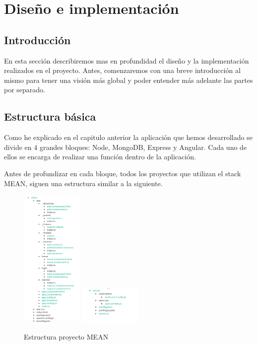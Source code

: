 \chapter{Diseño e implementación}

\section{Introducción}
En esta sección describiremos mas en profundidad el diseño y la implementación realizados en el proyecto. Antes, comenzaremos con una breve introducción al mismo para tener una visión más global y poder entender más adelante las partes por separado.

\section{Estructura básica}

Como he explicado en el capitulo anterior la aplicación que hemos desarrollado se divide en 4 grandes bloques: Node, MongoDB, Express y Angular. Cada uno de ellos se encarga de realizar una función dentro de la aplicación.

Antes de profundizar en cada bloque, todos los proyectos que utilizan el stack MEAN, siguen una estructura similar a la siguiente.

\begin{figure}[H]
    \centering
    \includegraphics[width=30mm]{memoria/LaTeX/img/aplicacion/cliente.png}
    \includegraphics[width=30mm]{memoria/LaTeX/img/aplicacion/server.png}
    \caption[Estructura proyecto MEAN]{Estructura proyecto MEAN}
\end{figure}


